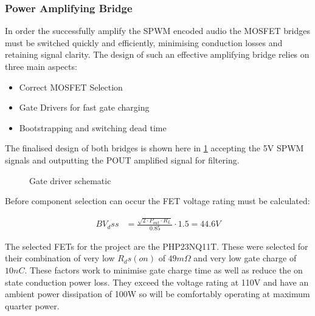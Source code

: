 \documentclass[11pt]{article}
\begin{document}
{\subsubsection*{Power Amplifying Bridge}\label{S:power_des}

In order the successfully amplify the SPWM encoded audio the MOSFET bridges must be switched quickly and efficiently, minimising conduction losses and retaining signal clarity. The design of such an effective amplifying bridge relies on three main aspects: 

\begin{itemize}
  \item Correct MOSFET Selection
  \item Gate Drivers for fast gate charging
  \item Bootstrapping and switching dead time
\end{itemize}

The finalised design of both bridges is shown here in \cref{F:gate_drive_schem} accepting the 5V SPWM signals and outputting the POUT amplified signal for filtering.

\begin{figure}[h!]
\centering
{}
\caption{Gate driver schematic}
\label{F:gate_drive_schem}
\end{figure}

Before component selection can occur the FET voltage rating must be calculated:

\begin{align}
  BV_dss &= \frac{\sqrt{2\cdot P_{out}\cdot R_{L}}}{0.85}\cdot1.5 = 44.6V
\end{align}

The selected FETs for the project are the PHP23NQ11T. These were selected for their combination of very low $R_ds(on)$ of $49m\Omega$ and very low gate charge of $10nC$. These factors work to minimise gate charge time as well as reduce the on state conduction power loss. They exceed the voltage rating at 110V and have an ambient power dissipation of 100W so will be comfortably operating at maximum quarter power. 

}
\end{document}
